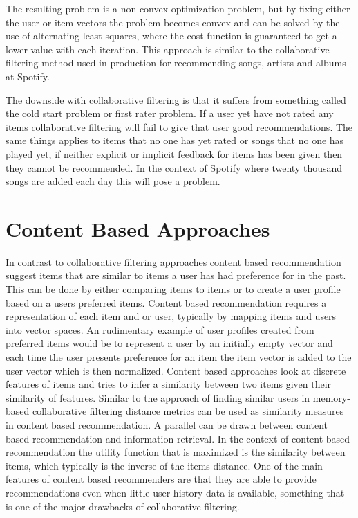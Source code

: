 \documentclass[a4paper,11pt]{kth-mag}
\begin{document}
The resulting problem is a non-convex optimization problem, but by fixing either the user or item vectors the problem becomes convex and can be solved by the use of alternating least squares, where the cost function is guaranteed to get a lower value with each iteration\cite{hu2008collaborative}. This approach is similar to the collaborative filtering method used in production for recommending songs, artists and albums at Spotify\cite{CJ}.

The downside with collaborative filtering is that it suffers from something called the cold start problem or first rater problem. If a user yet have not rated any items collaborative filtering will fail to give that user good recommendations. The same things applies to items that no one has yet rated or songs that no one has played yet, if neither explicit or implicit feedback for items has been given then they cannot be recommended\cite{herlocker2004evaluating}\cite{melville2002content}. In the context of Spotify where twenty thousand songs are added each day this will pose a problem.

\section{Content Based Approaches}
In contrast to collaborative filtering approaches content based recommendation suggest items that are similar to items  a user has had preference for in the past. This can be done by either comparing items to items or to create a user profile based on a users preferred items\cite{adomavicius2005toward}. Content based recommendation requires a representation of each item and or user, typically by mapping items and users into vector spaces. An rudimentary example of user profiles created from preferred items would be to represent a user by an initially empty vector and each time the user presents preference for an item the item vector is added to the user vector which is then normalized. Content based approaches look at discrete features of items and tries to infer a similarity between two items given their similarity of features. Similar to the approach of finding similar users in memory-based collaborative filtering distance metrics can be used as similarity measures in content based recommendation. A parallel can be drawn between content based recommendation and information retrieval. In the context of content based recommendation the utility function that is maximized is the similarity between items, which typically is the inverse of the items distance\cite{adomavicius2005toward}. One of the main features of content based recommenders are that they are able to provide recommendations even when little user history data is available, something that is one of the major drawbacks of collaborative filtering\cite{gunawardana2009unified}.
\end{document}
